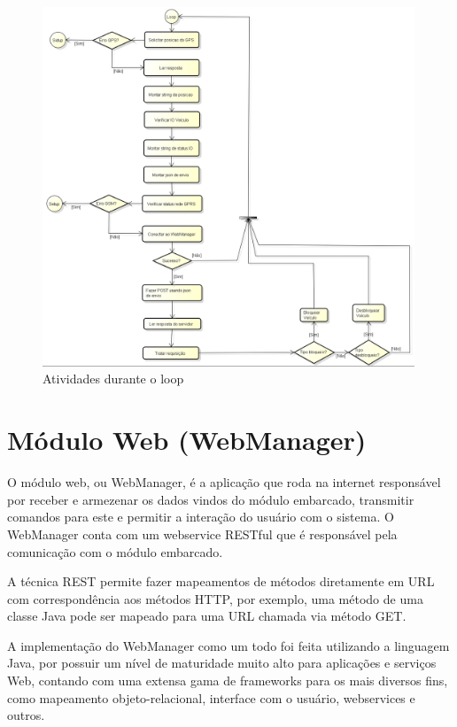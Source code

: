 \begin{figure}[!h]
	\centering
	\includegraphics[width=0.99\textwidth]{figures/ModuloVeicular_Loop.png}
	\caption{Atividades durante o loop}
	\label{1}
\end{figure}

\newpage

\section{Módulo Web (WebManager)}

O módulo web, ou WebManager, é a aplicação que roda na internet responsável por receber e armezenar os dados vindos do módulo embarcado, transmitir comandos para este e permitir a interação do usuário com o sistema. O WebManager conta com um webservice RESTful que é responsável pela comunicação com o módulo embarcado.

A técnica REST permite fazer mapeamentos de métodos diretamente em URL com correspondência aos métodos HTTP, por exemplo, uma método de uma classe Java pode ser mapeado para uma URL chamada via método GET.

A implementação do WebManager como um todo foi feita utilizando a linguagem Java, por possuir um nível de maturidade muito alto para aplicações e serviços Web, contando com uma extensa gama de frameworks para os mais diversos fins, como mapeamento objeto-relacional, interface com o usuário,  webservices e outros.


